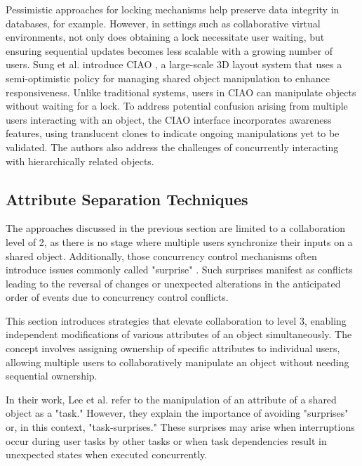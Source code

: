     Pessimistic approaches for locking mechanisms help preserve data integrity in databases, for example. However, in settings such as collaborative virtual environments, not only does obtaining a lock necessitate user waiting, but ensuring sequential updates becomes less scalable with a growing number of users. Sung et al. introduce CIAO \cite{sungConcurrencyControlCIAO1999}, a large-scale 3D layout system that uses a semi-optimistic policy for managing shared object manipulation to enhance responsiveness. Unlike traditional systems, users in CIAO can manipulate objects without waiting for a lock. To address potential confusion arising from multiple users interacting with an object, the CIAO interface incorporates awareness features, using translucent clones to indicate ongoing manipulations yet to be validated. The authors also address the challenges of concurrently interacting with hierarchically related objects.
    
    \subsection{Attribute Separation Techniques} \label{sec:dof_concurrency}

    The approaches discussed in the previous section are limited to a collaboration level of 2, as there is no stage where multiple users synchronize their inputs on a shared object. Additionally, those concurrency control mechanisms often introduce issues commonly called "surprise" \cite{linebargerConcurrencyControlMechanisms2004}. Such surprises manifest as conflicts leading to the reversal of changes or unexpected alterations in the anticipated order of events due to concurrency control conflicts. 
    
    This section introduces strategies that elevate collaboration to level 3, enabling independent modifications of various attributes of an object simultaneously. The concept involves assigning ownership of specific attributes to individual users, allowing multiple users to collaboratively manipulate an object without needing sequential ownership.
    
    In their work, Lee et al. \cite{leeSupportingFineGrainedConcurrent2012} refer to the manipulation of an attribute of a shared object as a "task." However, they explain the importance of avoiding "surprises" or, in this context, "task-surprises." These surprises may arise when interruptions occur during user tasks by other tasks or when task dependencies result in unexpected states when executed concurrently.


